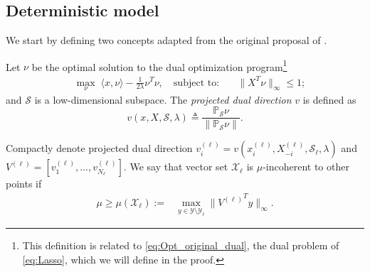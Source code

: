\documentclass[twoside,11pt]{article}
\numberwithin{equation}{section}
\def\cS{\mathcal{S}}
\begin{document}
\subsection{Deterministic model}
We start by defining two concepts adapted from the original proposal of \citet{soltanolkotabi2011geometric}.
\begin{definition}\label{def:proj_dual_direction}
Let $\nu$ be the optimal solution to the dual optimization program\footnote{This definition is related to \eqref{eq:Opt_original_dual}, the dual problem of \eqref{eq:Lasso}, which we will define in the proof.}
\begin{align*}
\quad \max_{\nu} \; \langle x,\nu \rangle - \frac{1}{2\lambda}\nu^T\nu,\quad\text{subject to:}\quad &\|X^T\nu\|_{\infty} \leq 1;
\end{align*}
and $\mathcal{S}$ is a low-dimensional subspace. The {\em projected dual direction} $v$ is  defined as
$$v(x,X,\mathcal{S},\lambda)\triangleq\frac{\mathbb{P}_{\mathcal{S}} \nu}{\|\mathbb{P}_{\mathcal{S}} \nu\|}.$$
\end{definition}


\begin{definition}\label{def:incoherence}
Compactly denote projected dual direction $v_i^{(\ell)}=v(x_i^{(\ell)},X_{-i}^{(\ell)},\mathcal{S}_{\ell},\lambda)$ and $V^{(\ell)}=[v_1^{(\ell)},...,v_{N_{\ell}}^{(\ell)}]$. We say that vector set $\mathcal{X}_{\ell}$ is $\mu$-incoherent to other points if
\begin{align*}
    \mu\geq \mu(\mathcal{X}_{\ell}) := &\max_{y\in \mathcal{Y}\setminus \mathcal{Y}_{\ell}}{\|{V^{(\ell)}}^Ty\|_{\infty}}.
\end{align*}
\end{definition}
%
\end{document}
